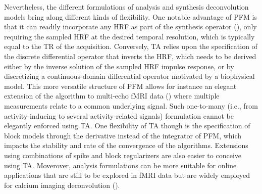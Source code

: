 Nevertheless, the different formulations of analysis and synthesis deconvolution models bring along different kinds of flexibility. One notable advantage of PFM is that it can readily incorporate any HRF as part of the synthesis operator (\citealt{Elad2007Analysisversussynthesis}), only requiring the sampled HRF at the desired temporal resolution, which is typically equal to the TR of the acquisition. Conversely, TA relies upon the specification of the discrete differential operator that inverts the HRF, which needs to be derived either by the inverse solution of the sampled HRF impulse response, or by discretizing a continuous-domain differential operator motivated by a biophysical model. This more versatile structure of PFM allows for instance an elegant extension of the algorithm to multi-echo fMRI data (\citealt{CaballeroGaudes2019deconvolutionalgorithmmulti}) where multiple measurements relate to a common underlying signal. Such one-to-many (i.e., from activity-inducing to several activity-related signals) formulation cannot be elegantly enforced using TA. One flexibility of TA though is the specification of block models through the derivative instead of the integrator of PFM, which impacts the stability and rate of the convergence of the algorithms. Extensions using combinations of spike and block regularizers are also easier to conceive using TA. Moverover, analysis formulations can be more suitable for online applications that are still to be explored in fMRI data but are widely employed for calcium imaging deconvolution (\citealt{Friedrich_2017,Jewell_2019}).

